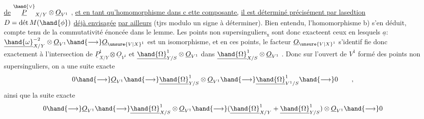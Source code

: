 
\uline{de} $\overset{\hand{\vee}}{\underline{P}}_{X/Y}\otimes\underline{O}_{V^1}$ , \uline{et en tant qu'homomorphisme dans c ette composante,}
\uline{il est déterminé précisément par lasedtion} $D = \text{dét}\,M(\hand{\phi})$ \uline{déjà envisagée}
\uline{par ailleurs} (tjrs modulo un signe à déterminer). Bien entendu,
l'homomorphisme b) s'en déduit, compte tenu de la commutativité énoncée
dans le lemme. Les points non supersinguliers$_{\text{x}}$ sont donc exacteent
ceux en lesquels $\underline{a}$: $\underline{\hand{\omega}}^{-2}_{X/Y}\otimes\underline{O}_{V^1}\hand{\longrightarrow}\underline{O}_{\unsure{V|X}^1}$ est un isomorphisme, et en
ces points,  le facteur $\underline{O}_{\unsure{V|X}^1}$ s'identif
fie donc exactement à l'intersection de $\underline{P}^1_{X/Y}\otimes\underline{O}_{V^1}$ et $\underline{\hand{\Omega}}^1_{Y/S}\otimes\underline{O}_{V^1}$
dans $\underline{\hand{\Omega}}^1_{X/S}\otimes\underline{O}_{V^1}$ . Donc sur l'ouvert de $V^1$ formé des points non
supersinguliers, on a une suite exacte
\[ 0\hand{\longrightarrow}\underline{O}_{V^1}\hand{\longrightarrow}\underline{\hand{\Omega}}^1_{Y/S}\otimes\underline{O}_{V^1}\hand{\longrightarrow}\underline{\hand{\Omega}}^1_{V^1/S}\hand{\longrightarrow} 0 \qquad , \]
ainsi que la suite exacte
\[ 0\hand{\longrightarrow}\underline{O}_{V^1}\hand{\longrightarrow}\underline{\hand{\Omega}}^1_{X/S}\otimes\underline{O}_{V^1}\hand{\longrightarrow}(\underline{\hand{\Omega}}^1_{X/Y}+\underline{\hand{\Omega}}^1_{Y/S})\otimes\underline{O}_{V^1}\hand{\longrightarrow} 0 \]

